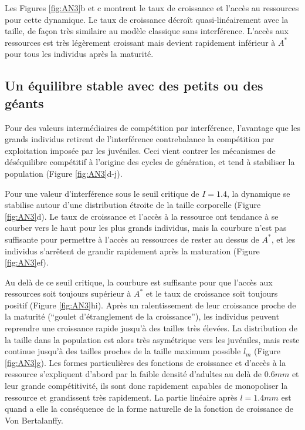 Les Figures \ref{fig:AN3}b et c montrent le taux de croissance et l'accès au
ressources pour cette dynamique. Le taux de croissance décroît
quasi-linéairement avec la taille, de façon très similaire au modèle classique
sans interférence. L'accès aux ressources est très légèrement croissant mais
devient rapidement inférieur à $A^*$ pour tous les individus après la maturité. 

\subsection{Un équilibre stable avec des petits ou des géants}

Pour des valeurs intermédiaires de compétition par interférence, l'avantage
que les grands individus retirent de l'interférence contrebalance la compétition
par exploitation imposée par les juvéniles. Ceci vient contrer les mécanismes
de déséquilibre compétitif à l'origine des cycles de génération, et tend à
stabiliser la population (Figure \ref{fig:AN3}d-j).

Pour une valeur d'interférence sous le seuil critique de $I=1.4$, la dynamique
se stabilise autour d'une distribution étroite de la taille corporelle (Figure
\ref{fig:AN3}d). Le taux de croissance et l'accès à la ressource ont tendance à
se courber vers le haut pour les plus grands individus, mais la courbure n'est
pas suffisante pour permettre à l'accès au ressources de rester au dessus de
$A^*$, et les individus s'arrêtent de grandir rapidement après la maturation (Figure
\ref{fig:AN3}ef).

Au delà de ce seuil critique, la courbure est suffisante pour que l'accès aux
ressources soit toujours supérieur à $A^*$ et le taux de croissance soit
toujours positif (Figure \ref{fig:AN3}hi). Après un ralentissement de leur
croissance proche de la maturité (``goulet d'étranglement de la croissance''), les individus peuvent
reprendre une croissance rapide jusqu'à des tailles très élevées. La
distribution de la taille dans la population est alors très asymétrique vers les
juvéniles, mais reste continue jusqu'à des tailles proches de la taille maximum
possible $l_m$ (Figure \ref{fig:AN3}g). Les formes particulières des fonctions
de croissance et d'accès à la ressource s'expliquent d'abord par la faible
densité d'adultes au delà de $0.6mm$ et leur grande compétitivité, ils
sont donc rapidement capables de monopoliser la ressource et grandissent très
rapidement. La partie linéaire après $l=1.4mm$ est quand a elle la conséquence
de la forme naturelle de la fonction de croissance de Von Bertalanffy. 

